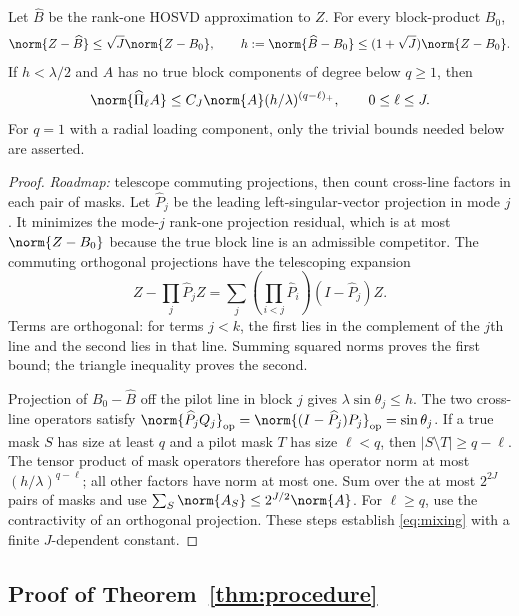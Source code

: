 \begin{lemma}\label{lem:pilot}
Let $\widehat B$ be the rank-one HOSVD approximation to $Z$. For every block-product $B_0$,
\[
 \norm{Z-\widehat B}\le\sqrt J\norm{Z-B_0},\qquad
 h:=\norm{\widehat B-B_0}\le(1+\sqrt J)\norm{Z-B_0}.
\]
If $h<\lambda/2$ and $A$ has no true block components of degree below $q\ge1$, then
\begin{equation}\label{eq:mixing}
 \norm{\widehat\Pi_\ell A}\le C_J\norm{A}
 (h/\lambda)^{(q-\ell)_+},\qquad 0\le\ell\le J.
\end{equation}
For $q=1$ with a radial loading component, only the trivial bounds needed below are asserted.
\end{lemma}
\begin{proof}
\emph{Roadmap:} telescope commuting projections, then count cross-line factors in each pair of masks. Let $\widehat P_j$ be the leading left-singular-vector projection in mode $j$. It minimizes the mode-$j$ rank-one projection residual, which is at most $\norm{Z-B_0}$ because the true block line is an admissible competitor. The commuting orthogonal projections have the telescoping expansion
\[
 Z-\prod_j\widehat P_j Z
 =\sum_j\left(\prod_{i<j}\widehat P_i\right)(I-\widehat P_j)Z.
\]
Terms are orthogonal: for terms $j<k$, the first lies in the complement of the $j$th line and the second lies in that line. Summing squared norms proves the first bound; the triangle inequality proves the second.

Projection of $B_0-\widehat B$ off the pilot line in block $j$ gives $\lambda\sin\theta_j\le h$. The two cross-line operators satisfy $\norm{\widehat P_jQ_j}_{\rm op}=\norm{(I-\widehat P_j)P_j}_{\rm op}=\sin\theta_j$. If a true mask $S$ has size at least $q$ and a pilot mask $T$ has size $\ell<q$, then $|S\setminus T|\ge q-\ell$. The tensor product of mask operators therefore has operator norm at most $(h/\lambda)^{q-\ell}$; all other factors have norm at most one. Sum over the at most $2^{2J}$ pairs of masks and use $\sum_S\norm{A_S}\le2^{J/2}\norm{A}$. For $\ell\ge q$, use the contractivity of an orthogonal projection. These steps establish \eqref{eq:mixing} with a finite $J$-dependent constant.
\end{proof}

\subsection{Proof of Theorem~\ref{thm:procedure}}
